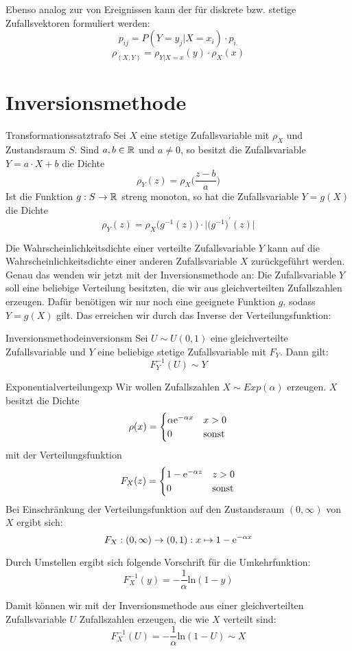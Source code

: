 Ebenso analog zur  von Ereignissen kann
der  für diskrete bzw. stetige Zufallsvektoren
formuliert werden:
\[p_{ij} = P(Y=y_j|X=x_i)\cdot p_{i.}\]
\[\rho_{(X,Y)} = \rho_{Y|X=x}(y)\cdot\rho_X(x)\]

\section{Inversionsmethode}

\begin{theorem}{Transformationssatz}{trafo}
Sei $X$ eine stetige Zufallsvariable mit  $\rho_X$ und
Zustandsraum $S$. Sind $a,b\in\mathbb{R}$ und $a \ne 0$, so besitzt die Zufallsvariable
$Y = a\cdot X + b$ die Dichte
\[\rho_Y(z) = \rho_X\Big(\frac{z-b}{a}\Big)\]
Ist die Funktion $g:S\to\mathbb{R}$ streng monoton, so hat die Zufallsvariable $Y=g(X)$
die Dichte
\[\rho_Y(z) = \rho_X\big(g^{-1}(z)\big)\cdot\big|\big(g^{-1}\big)^\prime(z)\big|\]
\end{theorem}

Die Wahrscheinlichkeitsdichte einer verteilte Zufallsvariable $Y$ kann auf die
Wahrscheinlichkeitsdichte einer anderen Zufallsvariable $X$ zurückgeführt
werden. Genau das wenden wir jetzt mit der Inversionsmethode an: Die
Zufallsvariable $Y$ soll eine beliebige Verteilung besitzten, die wir aus
gleichverteilten Zufallszahlen erzeugen. Dafür benötigen wir nur noch eine
geeignete Funktion $g$, sodass $Y=g(X)$ gilt. Das erreichen wir durch das
Inverse der Verteilungsfunktion:

\begin{theorem}{Inversionsmethode}{inversionsm}
Sei $U\sim U(0,1)$ eine gleichverteilte Zufallsvariable und $Y$ eine
beliebige stetige Zufallsvariable mit 
$F_Y$. Dann gilt:
\[F_Y^{-1}(U) \sim Y\]
\end{theorem}

\begin{example}{Exponentialverteilung}{exp}
Wir wollen Zufallszahlen $X\sim Exp(\alpha)$ erzeugen. $X$ besitzt die Dichte
\[
\rho(x) = \begin{cases}
\alpha \mathrm{e}^{-\alpha x} & x > 0 \\
0 & \text{sonst}
\end{cases}
\]
mit der Verteilungsfunktion
\[
F_X(z) = \begin{cases}
1- \mathrm{e}^{-\alpha z} & z > 0 \\
0 & \text{sonst}
\end{cases}
\]
Bei Einschränkung der Verteilungsfunktion auf den Zustandsraum $(0, \infty)$ von
$X$ ergibt sich:
\[F_X: (0,\infty)\to(0,1):x\mapsto1-\mathrm{e}^{-\alpha x}\]

Durch Umstellen ergibt sich folgende Vorschrift für die Umkehrfunktion:
\[F_X^{-1}(y) = -\frac{1}{\alpha} \mathrm{ln}(1-y)\]

Damit können wir mit der Inversionsmethode aus einer gleichverteilten
Zufallsvariable $U$ Zufallszahlen erzeugen, die wie $X$ verteilt sind:
\[F_X^{-1}(U) = -\frac{1}{\alpha} \mathrm{ln}(1-U) \sim X\]

\end{example}

